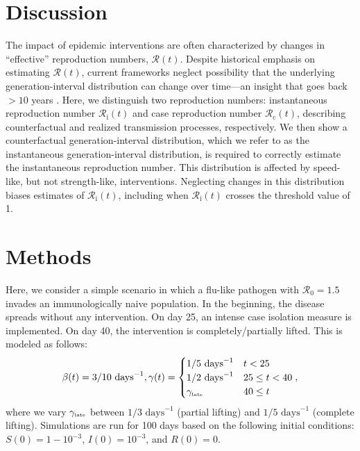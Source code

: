 \documentclass[12pt]{article}
\newcommand{\Rx}[1]{\ensuremath{{\mathcal R}_{#1}}\xspace}
\newcommand{\Ro}{\Rx{0}}
\newcommand{\Rc}{\Rx{\mathrm{c}}}
\newcommand{\Ri}{\Rx{\mathrm{i}}}
\newcommand{\RR}{\ensuremath{{\mathcal R}}\xspace}
\newcommand{\tsub}[2]{#1_{{\textrm{\tiny #2}}}}
\begin{document}
\section{Discussion}

The impact of epidemic interventions are often characterized by changes in ``effective'' reproduction numbers, $\RR(t)$.
Despite historical emphasis on estimating $\RR(t)$, current frameworks neglect possibility that the underlying generation-interval distribution can change over time---an insight that goes back $>10$ years \citep{fraser2007estimating}.
Here, we distinguish two reproduction numbers: instantaneous reproduction number $\Ri(t)$ and case reproduction number $\Rc(t)$, describing counterfactual and realized transmission processes, respectively.
We then show a counterfactual generation-interval distribution, which we refer to as the instantaneous generation-interval distribution, is required to correctly estimate the instantaneous reproduction number. 
This distribution is affected by speed-like, but not strength-like, interventions.
Neglecting changes in this distribution biases estimates of $\Ri(t)$, including when $\Ri(t)$ crosses the threshold value of 1.





\section{Methods}


Here, we consider a simple scenario in which a flu-like pathogen with $\Ro = 1.5$ invades an immunologically naive population.
In the beginning, the disease spreads without any intervention.
On day 25, an intense case isolation measure is implemented. 
On day 40, the intervention is completely/partially lifted.
This is modeled as follows:
\begin{equation}
\beta(t) = 3/10\,\,\textrm{days}^{-1}, \gamma(t) = \begin{cases}
1/5\,\, \textrm{days}^{-1} & t < 25\\
1/2\,\, \textrm{days}^{-1} & 25 \leq t < 40 \\
\tsub{\gamma}{late} & 40 \leq t
\end{cases},
\end{equation}
where we vary $\tsub{\gamma}{late}$ between $1/3\,\, \textrm{days}^{-1}$ (partial lifting) and $1/5\,\, \textrm{days}^{-1}$ (complete lifting).
Simulations are run for 100 days based on the following initial conditions: $S(0) = 1 - 10^{-3}$, $I(0) = 10^{-3}$, and $R(0) = 0$.
\end{document}
